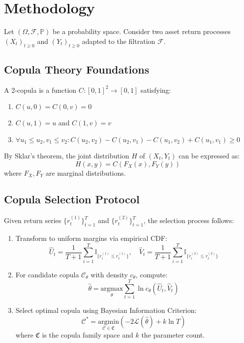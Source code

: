 \section{Methodology}
Let $(\Omega,\mathcal{F},\mathbb{P})$ be a probability space. Consider two asset return processes $(X_t)_{t\geq0}$ and $(Y_t)_{t\geq0}$ adapted to the filtration $\mathcal{F}$.

\subsection{Copula Theory Foundations}
A 2-copula is a function $C:[0,1]^2\rightarrow[0,1]$ satisfying:
\begin{enumerate}
    \item $C(u,0)=C(0,v)=0$
    \item $C(u,1)=u$ and $C(1,v)=v$
    \item $\forall u_1\leq u_2, v_1\leq v_2: C(u_2,v_2)-C(u_2,v_1)-C(u_1,v_2)+C(u_1,v_1)\geq0$
\end{enumerate}

By Sklar's theorem, the joint distribution $H$ of $(X_t,Y_t)$ can be expressed as:
\begin{equation}
    H(x,y) = C(F_X(x), F_Y(y))
\end{equation}
where $F_X,F_Y$ are marginal distributions.

\subsection{Copula Selection Protocol}
Given return series $\{r_t^{(1)}\}_{t=1}^T$ and $\{r_t^{(2)}\}_{t=1}^T$, the selection process follows:
\begin{enumerate}
    \item Transform to uniform margins via empirical CDF:
    \begin{equation}
        \hat{U}_t = \frac{1}{T+1}\sum_{i=1}^T \mathbb{I}_{\{r_i^{(1)} \leq r_t^{(1)}\}}, \quad \hat{V}_t = \frac{1}{T+1}\sum_{i=1}^T \mathbb{I}_{\{r_i^{(2)} \leq r_t^{(2)}\}}
    \end{equation}
    
    \item For candidate copula $\mathscr{C}_\theta$ with density $c_\theta$, compute:
    \begin{equation}
        \hat{\theta} = \underset{\theta}{\text{argmax}} \sum_{t=1}^T \ln c_\theta(\hat{U}_t, \hat{V}_t)
    \end{equation}

    \item Select optimal copula using Bayesian Information Criterion:
    \begin{equation}
        \mathscr{C}^* = \underset{\mathscr{C} \in \mathfrak{C}}{\text{argmin}} \left( -2\mathcal{L}(\hat{\theta}) + k\ln T \right)
    \end{equation}
    where $\mathfrak{C}$ is the copula family space and $k$ the parameter count.
\end{enumerate}

